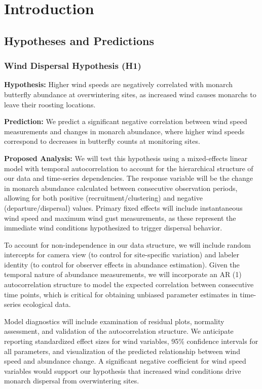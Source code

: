 \chapter{Introduction}
\label{ch:introduction}

\section{Hypotheses and Predictions}

\subsection{Wind Dispersal Hypothesis (H1)}

\textbf{Hypothesis:} Higher wind speeds are negatively correlated with monarch butterfly abundance at overwintering sites, as increased wind causes monarchs to leave their roosting locations.

\textbf{Prediction:} We predict a significant negative correlation between wind speed measurements and changes in monarch abundance, where higher wind speeds correspond to decreases in butterfly counts at monitoring sites.

\textbf{Proposed Analysis:}
We will test this hypothesis using a mixed-effects linear model with temporal autocorrelation to account for the hierarchical structure of our data and time-series dependencies. The response variable will be the change in monarch abundance calculated between consecutive observation periods, allowing for both positive (recruitment/clustering) and negative (departure/dispersal) values. Primary fixed effects will include instantaneous wind speed and maximum wind gust measurements, as these represent the immediate wind conditions hypothesized to trigger dispersal behavior. 

To account for non-independence in our data structure, we will include random intercepts for camera view (to control for site-specific variation) and labeler identity (to control for observer effects in abundance estimation). Given the temporal nature of abundance measurements, we will incorporate an AR (1) autocorrelation structure to model the expected correlation between consecutive time points, which is critical for obtaining unbiased parameter estimates in time-series ecological data.

Model diagnostics will include examination of residual plots, normality assessment, and validation of the autocorrelation structure. We anticipate reporting standardized effect sizes for wind variables, 95\% confidence intervals for all parameters, and visualization of the predicted relationship between wind speed and abundance change. A significant negative coefficient for wind speed variables would support our hypothesis that increased wind conditions drive monarch dispersal from overwintering sites.

